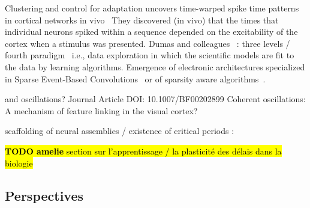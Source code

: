 \documentclass[brainsci, %
               review,submit,pdftex,moreauthors%
               ]{Definitions/mdpi}
\newcommand{\note}[1]{{\sethlcolor{yellow}\hl{#1}}}
\begin{document}
Clustering and control for adaptation uncovers time-warped spike time patterns in cortical networks in vivo~\citep{Isbister} They discovered (in vivo) that the times that individual neurons spiked within a sequence depended on the excitability of the cortex when a stimulus was presented.
Dumas and colleagues~\citep{panahi_generative_2021} : three levels / fourth paradigm~\citep{tolle_fourth_2011} i.e., data exploration in which the scientific models are fit to the data by learning algorithms.
Emergence of electronic architectures specialized in Sparse Event-Based Convolutions~\citep{di_mauro_alfio_sne_2022} or of sparsity aware algorithms~\citep{yin_sata_2022}.

and oscillations? Journal Article DOI: 10.1007/BF00202899 Coherent oscillations: A mechanism of feature linking in the visual cortex?

scaffolding of neural assemblies / existence of critical periods :~\citep{dard_rapid_2021}



\note{\textbf{TODO amelie} section sur l'apprentissage / la plasticité des délais dans la biologie}

\subsection{Perspectives}
\end{document}
